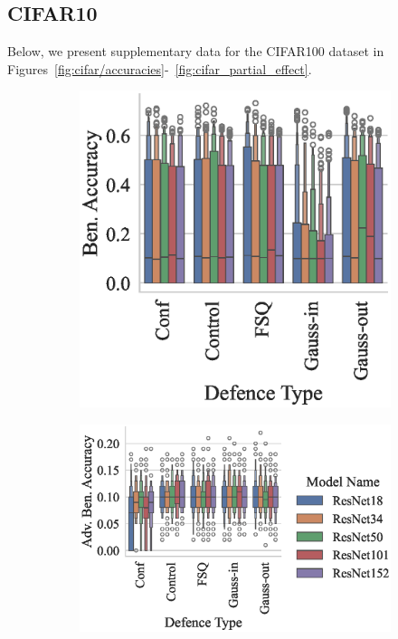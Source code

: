 \subsection{CIFAR10}
Below, we present supplementary data for the CIFAR100 dataset in Figures~\ref{fig:cifar/accuracies}-~\ref{fig:cifar_partial_effect}.


\begin{figure}
\begin{subfigure}[]{0.26\textwidth}
    \centering
    \includegraphics[width=\textwidth]{cifar/ben_accuracy_vs_defence_type.eps}
\end{subfigure}
\begin{subfigure}[]{0.26\textwidth}
    \centering
    \includegraphics[width=\textwidth]{cifar/adv_accuracy_vs_defence_type.eps}

\end{subfigure}
\end{figure}
